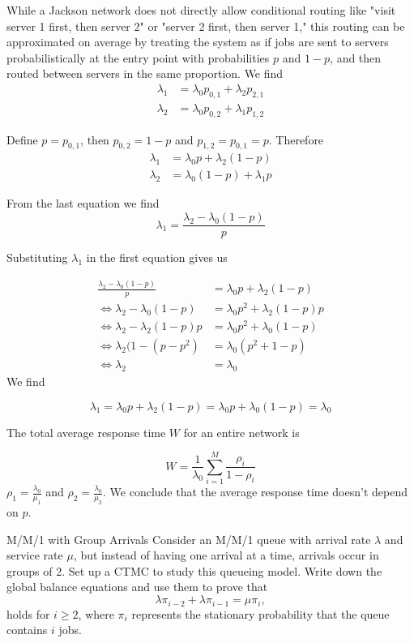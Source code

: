 \begin{solution}
  While a Jackson network does not directly allow conditional routing like "visit server 1 first, then server 2" or "server 2 first, then server 1," this routing can be approximated on average by treating the system as if jobs are sent to servers probabilistically at the entry point with probabilities $p$ and $1-p$, and then routed between servers in the same proportion. We find
  \begin{align*}
    \lambda_1 &= \lambda_0p_{0,1} + \lambda_2p_{2,1} \\
    \lambda_2 &= \lambda_0p_{0,2} + \lambda_1p_{1,2}
  \end{align*}

  Define $p=p_{0,1}$, then $p_{0,2}=1-p$ and $p_{1,2} = p_{0,1} = p$. Therefore
  \begin{align*}
    \lambda_1 &= \lambda_0p + \lambda_2(1-p) \\
    \lambda_2 &= \lambda_0(1-p) + \lambda_1p
  \end{align*}

  From the last equation we find
  \[
    \lambda_1 = \frac{\lambda_2-\lambda_0(1-p)}{p}
  \]

  Substituting $\lambda_1$ in the first equation gives us

  \begin{align*}
    \frac{\lambda_2-\lambda_0(1-p)}{p} &= \lambda_0p + \lambda_2(1-p) \\
    \Leftrightarrow\lambda_2-\lambda_0(1-p) &= \lambda_0p^2 + \lambda_2(1-p)p \\
    \Leftrightarrow\lambda_2-\lambda_2(1-p)p &= \lambda_0p^2 + \lambda_0(1-p) \\
    \Leftrightarrow\lambda_2(1-(p-p^2) &= \lambda_0(p^2 + 1-p) \\
    \Leftrightarrow\lambda_2 &= \lambda_0
  \end{align*}
  We find

  \[
    \lambda_1 = \lambda_0p + \lambda_2(1-p) = \lambda_0p + \lambda_0(1-p) = \lambda_0
  \]

  The total average response time $W$ for an entire network is

  \[
    W = \frac{1}{\lambda_0}\sum_{i=1}^M\frac{\rho_i}{1-\rho_i}
  \]
  $\rho_1 = \frac{\lambda_0}{\mu_1}$ and $\rho_2 = \frac{\lambda_0}{\mu_2}$. We conclude that the average response time doesn't depend on $p$.
\end{solution}

\begin{problem}{M/M/1 with Group Arrivals}
Consider an M/M/1 queue with arrival rate \( \lambda \) and service rate \( \mu \), but instead of having one arrival at a time, arrivals occur in groups of 2. Set up a CTMC to study this queueing model. Write down the global balance equations and use them to prove that
   \[
   \lambda \pi_{i-2} + \lambda \pi_{i-1} = \mu \pi_i,
   \]
   holds for \( i \geq 2 \), where \( \pi_i \) represents the stationary probability that the queue contains \( i \) jobs.
\end{problem}

